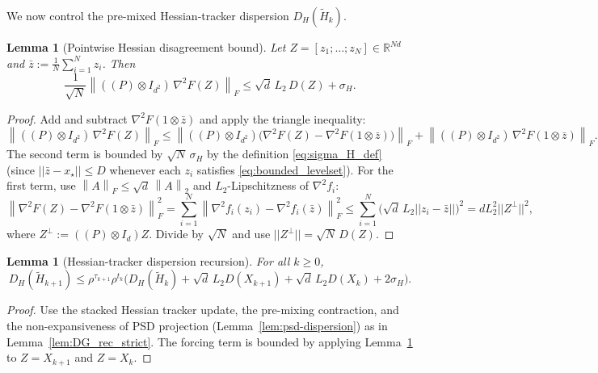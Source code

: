 \documentclass[11pt,a4paper]{article}
\def\one{1}%
\def\J{J}%
\def\Pmat{P}%
\def\norm#1{||#1||}%
\newtheorem{lemma}[theorem]{Lemma}
\newcommand{\R}{\mathbb{R}}
\newcommand{\one}{\mathbf{1}}
\newcommand{\norm}[1]{\left\|#1\right\|}
\newcommand{\normtwo}[1]{\left\|#1\right\|_2}
\newcommand{\normF}[1]{\left\|#1\right\|_F}
\newcommand{\J}{\left(\frac{1}{N}\one\one^\top\right)}
\newcommand{\Pmat}{I-\J}
\begin{document}
	We now control the pre-mixed Hessian-tracker dispersion $D_H(\tilde H_k)$.
	
	\begin{lemma}[Pointwise Hessian disagreement bound]\label{lem:hess_disagree_pointwise_app}
		Let $Z=[z_1;\dots;z_N]\in\R^{Nd}$ and $\bar z:=\frac1N\sum_{i=1}^N z_i$.
		Then
		\begin{equation}\label{eq:hess_disagree_pointwise_app}
			\frac{1}{\sqrt N}\normF{((\Pmat)\otimes I_{d^2})\,\nabla^2 F(Z)}
			\le \sqrt d\,L_2\,D(Z)+\sigma_H.
		\end{equation}
	\end{lemma}
	\begin{proof}
		Add and subtract $\nabla^2 F(\one\otimes\bar z)$ and apply the triangle inequality:
		\[
		\normF{((\Pmat)\otimes I_{d^2})\,\nabla^2 F(Z)}
		\le \normF{((\Pmat)\otimes I_{d^2})\big(\nabla^2 F(Z)-\nabla^2 F(\one\otimes\bar z)\big)}
		+\normF{((\Pmat)\otimes I_{d^2})\,\nabla^2 F(\one\otimes\bar z)}.
		\]
		The second term is bounded by $\sqrt N\,\sigma_H$ by the definition \eqref{eq:sigma_H_def} (since $\norm{\bar z-x_\star}\le D$ whenever each $z_i$ satisfies \eqref{eq:bounded_levelset}).
		For the first term, use $\normF{A}\le \sqrt d\,\normtwo{A}$ and $L_2$-Lipschitzness of $\nabla^2 f_i$:
		\[
		\normF{\nabla^2 F(Z)-\nabla^2 F(\one\otimes\bar z)}^2
		=\sum_{i=1}^N\normF{\nabla^2 f_i(z_i)-\nabla^2 f_i(\bar z)}^2
		\le \sum_{i=1}^N\big(\sqrt d\,L_2\norm{z_i-\bar z}\big)^2
		=dL_2^2\norm{Z^\perp}^2,
		\]
		where $Z^\perp:=((\Pmat)\otimes I_d)Z$. Divide by $\sqrt N$ and use $\norm{Z^\perp}=\sqrt N\,D(Z)$.
	\end{proof}
	
	\begin{lemma}[Hessian-tracker dispersion recursion]\label{lem:DH_rec_strict}
		For all $k\ge 0$,
		\begin{equation}\label{eq:DH_rec_strict}
D_H(\tilde H_{k+1})
\le \rho^{\tau_{k+1}}\rho^{t_k}\Big(D_H(\tilde H_k)+\sqrt d\,L_2 D(X_{k+1})+\sqrt d\,L_2 D(X_k)+2\sigma_H\Big).
		\end{equation}
	\end{lemma}
	\begin{proof}
		Use the stacked Hessian tracker update, the pre-mixing contraction, and the non-expansiveness of PSD projection (Lemma~\ref{lem:psd-dispersion}) as in Lemma~\ref{lem:DG_rec_strict}.
		The forcing term is bounded by applying Lemma~\ref{lem:hess_disagree_pointwise_app} to $Z=X_{k+1}$ and $Z=X_k$.
	\end{proof}
	
\end{document}
